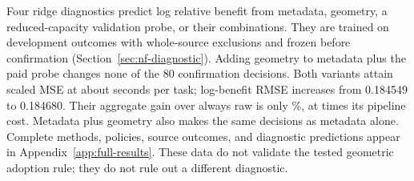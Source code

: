 Four ridge diagnostics predict log relative benefit from metadata,
geometry, a reduced-capacity validation probe, or their combinations.
They are trained on development outcomes with whole-source exclusions
and frozen before confirmation (Section~\ref{sec:nf-diagnostic}). Adding
geometry to metadata plus the paid probe changes none of the 80
confirmation decisions. Both variants attain scaled MSE
\NaturalProbeLoss{} at about \NaturalProbeCost{} seconds per task;
log-benefit RMSE increases from 0.184549 to 0.184680. Their aggregate
gain over always raw is only \NaturalProbeGainPercent\%, at
\NaturalProbeCostRatio{} times its pipeline cost. Metadata plus geometry
also makes the same decisions as metadata alone. Complete methods,
policies, source outcomes, and diagnostic predictions appear in
Appendix~\ref{app:full-results}. These data do not validate the tested
geometric adoption rule; they do not rule out a different diagnostic.
